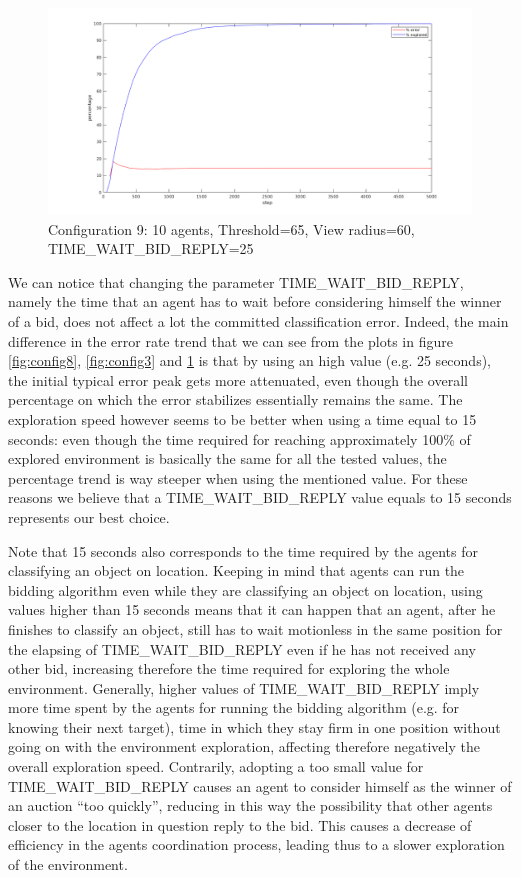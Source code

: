 \documentclass[a4paper, 10pt, conference]{ieeeconf}      %
\begin{document}
\begin{figure}[H]
	\centering
	\includegraphics[width=1\linewidth]{img/config9.png}
	\caption{Configuration 9: 10 agents, Threshold=65, View radius=60, TIME\_WAIT\_BID\_REPLY=25}
	\label{fig:config9}
\end{figure}

We can notice that changing the parameter TIME\_WAIT\_BID\_REPLY, namely the time that an agent has to wait before considering himself the winner of a bid, does not affect a lot the committed classification error. Indeed, the main difference in the error rate trend that we can see from the plots in figure \ref{fig:config8}, \ref{fig:config3} and \ref{fig:config9} is that by using an high value (e.g. 25 seconds), the initial typical error peak gets more attenuated, even though the overall percentage on which the error stabilizes essentially remains the same. The exploration speed however seems to be better when using a time equal to 15 seconds: even though the time required for reaching approximately 100\% of explored environment is basically the same for all the tested values, the percentage trend is way steeper when using the mentioned value. For these reasons we believe that a TIME\_WAIT\_BID\_REPLY value equals to 15 seconds represents our best choice.

Note that 15 seconds also corresponds to the time required by the agents for classifying an object on location. Keeping in mind that agents can run the bidding algorithm even while they are classifying an object on location, using values higher than 15 seconds means that it can happen that an agent, after he finishes to classify an object, still has to wait motionless in the same position for the elapsing of TIME\_WAIT\_BID\_REPLY even if he has not received any other bid, increasing therefore the time required for exploring the whole environment. Generally, higher values of TIME\_WAIT\_BID\_REPLY imply more time spent by the agents for running the bidding algorithm (e.g. for knowing their next target), time in which they stay firm in one position without going on with the environment exploration, affecting therefore negatively the overall exploration speed. Contrarily, adopting a too small value for TIME\_WAIT\_BID\_REPLY causes an agent to consider himself as the winner of an auction ``too quickly'', reducing in this way the possibility that other agents closer to the location in question reply to the bid. This causes a decrease of efficiency in the agents coordination process, leading thus to a slower exploration of the environment.
\end{document}
